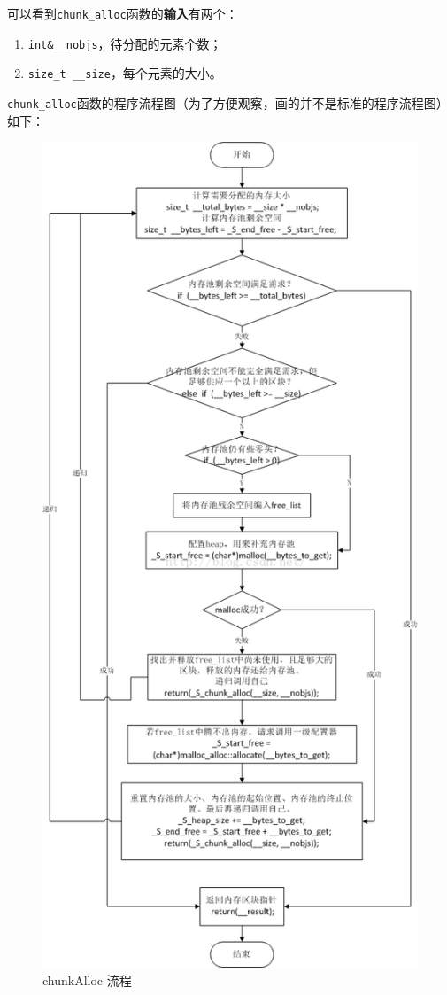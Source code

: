 \documentclass[UTF8,a4paper,12pt]{ctexbook}
\begin{document}
			  可以看到\verb|chunk_alloc|函数的\textbf{输入}有两个：
			  	\begin{enumerate}
			  		\item \verb|int&__nobjs|，待分配的元素个数；
			  		\item \verb|size_t __size|，每个元素的大小。
			  	\end{enumerate}
			  
			\verb|chunk_alloc|函数的程序流程图（为了方便观察，画的并不是标准的程序流程图）如下：
				\begin{figure}[H]
					\centering
					\includegraphics[scale=0.5]{chunk.png}
					\caption{chunkAlloc 流程}
				\end{figure}
				
\end{document}
